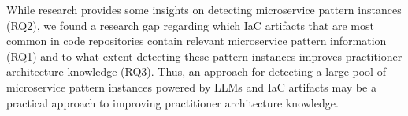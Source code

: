 While research provides some insights on detecting microservice pattern instances (RQ2), we found a research gap regarding which IaC artifacts that are most common in code repositories contain relevant microservice pattern information (RQ1) and to what extent detecting these pattern instances improves practitioner architecture knowledge (RQ3). Thus, an approach for detecting a large pool of microservice pattern instances powered by LLMs and IaC artifacts may be a practical approach to improving practitioner architecture knowledge.

